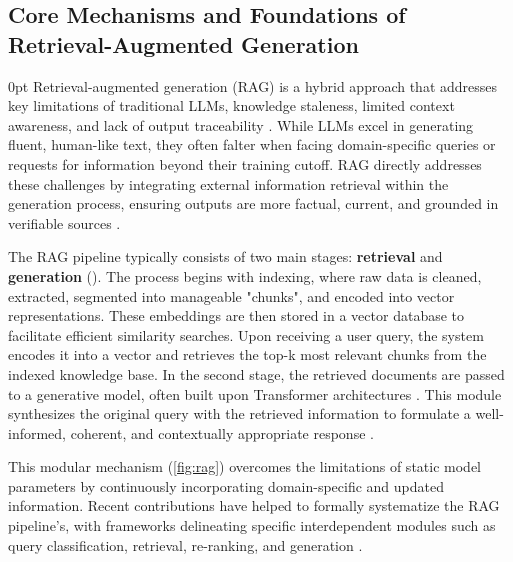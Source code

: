 \begin{spacing}{1.5}
\section{Core Mechanisms and Foundations of Retrieval-Augmented Generation}\setlength{\parskip}
{0pt}
Retrieval-augmented generation (RAG) is a hybrid approach that addresses key limitations of traditional LLMs, knowledge staleness, limited context awareness, and lack of output traceability \parencite{vaibhav_retrieval-augmented_2025,gao_retrieval-augmented_2024, gupta_comprehensive_2024}. While LLMs excel in generating fluent, human-like text, they often falter when facing domain-specific queries or requests for information beyond their training cutoff. RAG directly addresses these challenges by integrating external information retrieval within the generation process, ensuring outputs are more factual, current, and grounded in verifiable sources \citep{wang_searching_2024}.

The RAG pipeline typically consists of two main stages: \textbf{retrieval} and \textbf{generation} (\cite{odsc-community_retrieval-augmented_2024}). The process begins with indexing, where raw data is cleaned, extracted, segmented into manageable "chunks", and encoded into vector representations. These embeddings are then stored in a vector database to facilitate efficient similarity searches. Upon receiving a user query, the system encodes it into a vector and retrieves the top-k most relevant chunks from the indexed knowledge base. In the second stage, the retrieved documents are passed to a generative model, often built upon Transformer architectures \citep{vaswani_attention_2017}. This module synthesizes the original query with the retrieved information to formulate a well-informed, coherent, and contextually appropriate response \citep{arslan_survey_2024}.

This modular mechanism (\autoref{fig:rag}) overcomes the limitations of static model parameters by continuously incorporating domain-specific and updated information. Recent contributions have helped to formally systematize the RAG pipeline's, with frameworks delineating specific interdependent modules such as query classification, retrieval, re-ranking, and generation \parencite{wang_searching_2024}.


\end{spacing}
